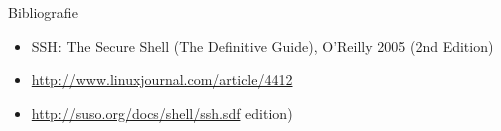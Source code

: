 \documentclass{beamer}
\begin{document}
\begin{frame}{Bibliografie}
  \begin{itemize}
    \item SSH: The Secure Shell (The Definitive Guide), O'Reilly 2005 (2nd
Edition)
    \item \url{http://www.linuxjournal.com/article/4412}
    \item \url{http://suso.org/docs/shell/ssh.sdf}
edition)
  \end{itemize}
\end{frame}
\end{document}
